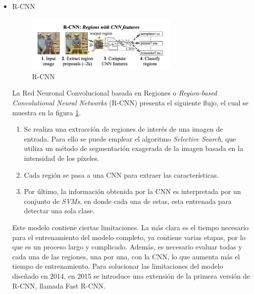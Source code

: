 \begin{itemize}
    \item R-CNN \\
    \begin{figure}[H]
        \centering
        \includegraphics[width=0.70\textwidth]{Imagenes/GeoAI/RCNN.png}
        \caption{R-CNN} \label{fig:RCNN}
    \end{figure}
    La Red Neuronal Convolucional basada en Regiones o \textit{Region-based Convolutional Neural Networks} (R-CNN) presenta el siguiente flujo, el cual se muestra en la figura \ref{fig:RCNN}.
    \begin{enumerate}
        \item Se realiza una extracción de regiones de interés de una imagen de entrada.
        Para ello se puede emplear el algoritmo \textit{Selective Search}, que utiliza un método de segmentación exagerada de la imagen basada en la intensidad de los píxeles.
        \item Cada región se pasa a una CNN para extraer las características.
        \item Por último, la información obtenida por la CNN es interpretada por un conjunto de \textit{SVMs}, en donde cada una de estas, esta entrenada para detectar una sola clase.
    \end{enumerate}
    
    Este modelo contiene ciertas limitaciones. La más clara es el tiempo necesario para el entrenamiento del modelo completo, ya contiene varias etapas, por lo que es un proceso largo y complicado. 
    Además, es necesario evaluar todas y cada una de las regiones, una por una, con la CNN, lo que aumenta más el tiempo de entrenamiento.
    Para solucionar las limitaciones del modelo diseñado en 2014, en 2015 se introduce una extensión de la primera versión de R-CNN, llamada Fast R-CNN.
    

\end{itemize}
